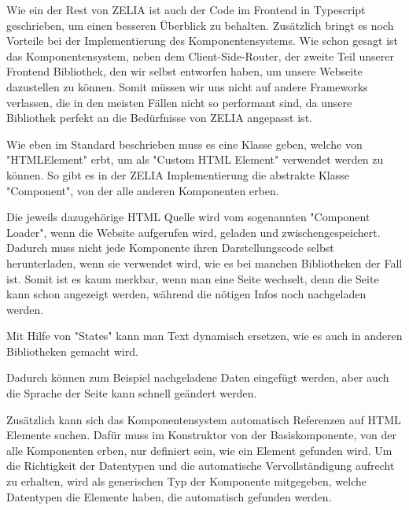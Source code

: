 

Wie ein der Rest von ZELIA ist auch der Code im Frontend in Typescript geschrieben, um einen besseren Überblick zu behalten. Zusätzlich bringt es noch Vorteile bei der Implementierung des Komponentensystems. Wie schon gesagt ist das Komponentensystem, neben dem Client-Side-Router, der zweite Teil unserer Frontend Bibliothek, den wir selbst entworfen haben, um unsere Webseite dazustellen zu können. Somit müssen wir uns nicht auf andere Frameworks verlassen, die in den meisten Fällen nicht so performant sind, da unsere Bibliothek perfekt an die Bedürfnisse von ZELIA angepasst ist.

Wie eben im Standard beschrieben muss es eine Klasse geben, welche von "HTMLElement" erbt, um als "Custom HTML Element" verwendet werden zu können. So gibt es in der ZELIA Implementierung die abstrakte Klasse "Component", von der alle anderen Komponenten erben.


Die jeweils dazugehörige HTML Quelle wird vom sogenannten "Component Loader", wenn die Website aufgerufen wird, geladen und zwischengespeichert. Dadurch muss nicht jede Komponente ihren Darstellungscode selbst herunterladen, wenn sie verwendet wird, wie es bei manchen Bibliotheken der Fall ist. Somit ist es kaum merkbar, wenn man eine Seite wechselt, denn die Seite kann schon angezeigt werden, während die nötigen Infos noch nachgeladen werden.

Mit Hilfe von "States" kann man Text dynamisch ersetzen, wie es auch in anderen Bibliotheken gemacht wird.


Dadurch können zum Beispiel nachgeladene Daten eingefügt werden, aber auch die Sprache der Seite kann schnell geändert werden.

Zusätzlich kann sich das Komponentensystem automatisch Referenzen auf HTML Elemente suchen. Dafür muss im Konstruktor von der Basiskomponente, von der alle Komponenten erben, nur definiert sein, wie ein Element gefunden wird. Um die Richtigkeit der Datentypen und die automatische Vervollständigung aufrecht zu erhalten, wird als generischen Typ der Komponente mitgegeben, welche Datentypen die Elemente haben, die automatisch gefunden werden.

